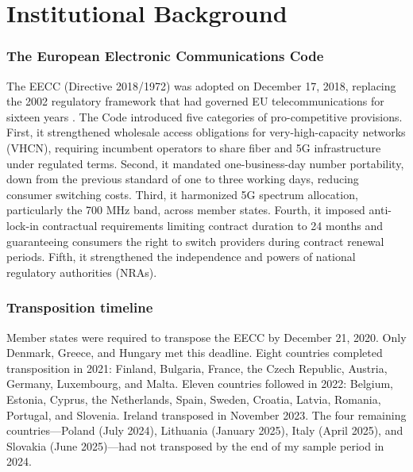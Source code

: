 \documentclass[12pt]{article}
\begin{document}
\section{Institutional Background}

\subsubsection*{The European Electronic Communications Code} The EECC (Directive 2018/1972) was adopted on December 17, 2018, replacing the 2002 regulatory framework that had governed EU telecommunications for sixteen years \citep{cave2019european}. The Code introduced five categories of pro-competitive provisions. First, it strengthened wholesale access obligations for very-high-capacity networks (VHCN), requiring incumbent operators to share fiber and 5G infrastructure under regulated terms. Second, it mandated one-business-day number portability, down from the previous standard of one to three working days, reducing consumer switching costs. Third, it harmonized 5G spectrum allocation, particularly the 700 MHz band, across member states. Fourth, it imposed anti-lock-in contractual requirements limiting contract duration to 24 months and guaranteeing consumers the right to switch providers during contract renewal periods. Fifth, it strengthened the independence and powers of national regulatory authorities (NRAs).

\subsubsection*{Transposition timeline} Member states were required to transpose the EECC by December 21, 2020. Only Denmark, Greece, and Hungary met this deadline. Eight countries completed transposition in 2021: Finland, Bulgaria, France, the Czech Republic, Austria, Germany, Luxembourg, and Malta. Eleven countries followed in 2022: Belgium, Estonia, Cyprus, the Netherlands, Spain, Sweden, Croatia, Latvia, Romania, Portugal, and Slovenia. Ireland transposed in November 2023. The four remaining countries---Poland (July 2024), Lithuania (January 2025), Italy (April 2025), and Slovakia (June 2025)---had not transposed by the end of my sample period in 2024.
\end{document}
